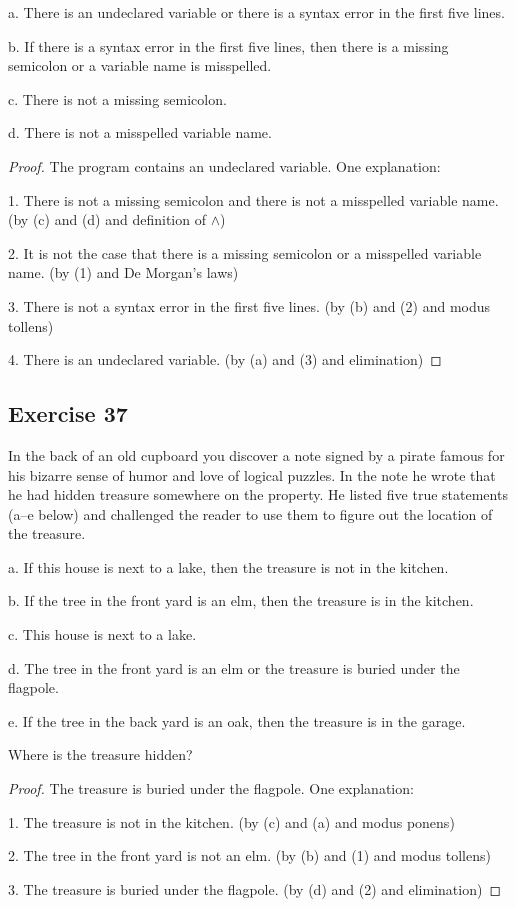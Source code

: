 \documentclass[14pt]{extarticle}
\begin{document}
a. There is an undeclared variable or there is a syntax error in the first five lines.

b. If there is a syntax error in the first five lines, then there is a missing semicolon or a variable name is misspelled.

c. There is not a missing semicolon.

d. There is not a misspelled variable name.

\begin{proof}
The program contains an undeclared variable. One explanation:

1. There is not a missing semicolon and there is not a misspelled variable name. (by (c) and (d) and definition of $\wedge$)

2. It is not the case that there is a missing semicolon or a misspelled variable name. (by (1) and De Morgan’s laws)

3. There is not a syntax error in the first five lines. (by (b) and (2) and modus tollens)

4. There is an undeclared variable. (by (a) and (3) and elimination)
\end{proof}

\subsection{Exercise 37}
In the back of an old cupboard you discover a note signed by a pirate famous for his bizarre sense of humor and love of logical puzzles. In the note he wrote that he had hidden treasure somewhere on the property. He listed five true statements (a–e below) and challenged the reader to use them to figure out the location of the treasure.

a. If this house is next to a lake, then the treasure is not in the kitchen.

b. If the tree in the front yard is an elm, then the treasure is in the kitchen.

c. This house is next to a lake.

d. The tree in the front yard is an elm or the treasure is buried under the flagpole.

e. If the tree in the back yard is an oak, then the treasure is in the garage.

Where is the treasure hidden?

\begin{proof}
The treasure is buried under the flagpole. One explanation:

1. The treasure is not in the kitchen. (by (c) and (a) and modus ponens)

2. The tree in the front yard is not an elm. (by (b) and (1) and modus tollens)

3. The treasure is buried under the flagpole. (by (d) and (2) and elimination)
\end{proof}
\end{document}
